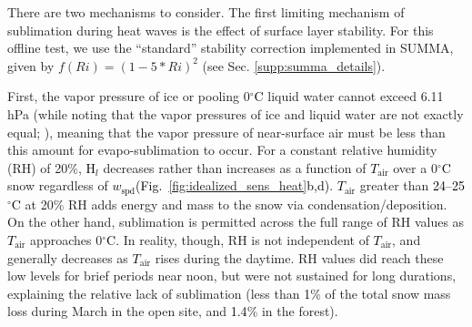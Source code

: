 \documentclass[draft]{agujournal2019}
\newcommand{\fig}[2]{\textcolor{black}{(Fig.~\ref{#1}{#2})}}   %
\newcommand{\fignop}[2]{\textcolor{black}{Fig.~\ref{#1}{#2}}}  %
\newcommand{\mynum}[1]{\textcolor{black}{#1}}
\newcommand{\tair}{\textcolor{black}{$T_{\mathrm{air}}$}\xspace}
\newcommand{\wspd}{\textcolor{black}{$w_{\mathrm{spd}}$}\xspace}
\newcommand{\hs}{\textcolor{black}{H$_s$}\xspace}
\newcommand{\hlat}{\textcolor{black}{H$_l$}\xspace}
\newcommand{\ms}{\textcolor{black}{m$\cdot$s$^{-1}$}\xspace}
\newcommand{\degrc}{\textcolor{black}{$^\circ$C}\xspace}
\begin{document}

There are two mechanisms to consider. 
The first limiting mechanism of sublimation during heat waves is the effect of surface layer stability.
For this offline test, we use the ``standard'' stability correction implemented in SUMMA, given by $f(Ri) = (1-5*Ri)^2$ (see Sec. \ref{supp:summa_details}).

First, the vapor pressure of ice or pooling 0\degrc liquid water cannot exceed 6.11 hPa (while noting that the vapor pressures of ice and liquid water are not exactly equal; ), meaning that the vapor pressure of near-surface air must be less than this amount for evapo-sublimation to occur. 
For a constant relative humidity (RH) of 20\%, \hlat decreases rather than increases as a function of \tair over a 0\degrc snow regardless of \wspd \fig{fig:idealized_sens_heat}{b,d}.
\tair greater than \mynum{24--25} \degrc at 20\% RH adds energy and mass to the snow via condensation/deposition.
On the other hand, sublimation is permitted across the full range of RH values as \tair approaches 0\degrc.
In reality, though, RH is not independent of \tair, and generally decreases as \tair rises during the daytime.
RH values did reach these low levels for brief periods near noon, but were not sustained for long durations, explaining the relative lack of sublimation (less than \mynum{1}\% of the total snow mass loss during March in the open site, and \mynum{1.4}\% in the forest).
\end{document}
